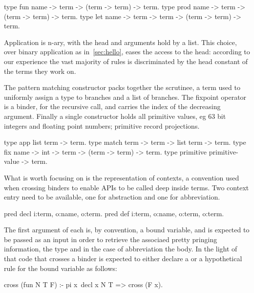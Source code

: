 \documentclass[a4paper, 11pt]{book}
\begin{document}
\begin{elpicode}
type fun  name -> term -> (term -> term) -> term.            %
type prod name -> term -> (term -> term) -> term.            %
type let  name -> term -> term -> (term -> term) -> term.    %
\end{elpicode}

Application is n-ary, with the head and arguments hold by a list.
This choice, over binary application as in~\ref{sec:hello}, eases
the access to the head: according to our experience the vast majority
of rules is discriminated by the head constant of the terms they work on.

The pattern matching constructor packs together the scrutinee,
a term used to uniformly assign a type to branches and a list of
branches. The fixpoint operator is a binder, for the recursive call,
and carries the index of the decreasing argument. Finally a single
constructor holds all primitive values, eg 63 bit integers and floating
point numbers; primitive record projections.

\begin{elpicode}
type app       list term -> term.                     
type match     term -> term -> list term -> term.   
type fix       name -> int -> term -> (term -> term) -> term.
type primitive primitive-value -> term.
\end{elpicode}

What is worth focusing on is the representation of contexts, a convention
used when crossing binders to enable APIs to be called deep inside terms.
Two context entry need to be available, one for abstraction and one for
abbreviation.

\begin{elpicode}
pred decl i:term, o:name, o:term.                 %
pred def  i:term, o:name, o:term, o:term.         %
\end{elpicode}

The first argument of each is, by convention, a bound variable, and is
expected to be passed as an input in order to retrieve the associaed
pretty pringing information, the type and in the case of
abbreviation the body. In the light of that code that crosses a binder
is expected to either declare a  or a 
hypothetical rule for the bound variable as follows:

\begin{elpicode}
cross (fun N T F) :- pi x\ decl x N T => cross (F x).
\end{elpicode}
\end{document}
